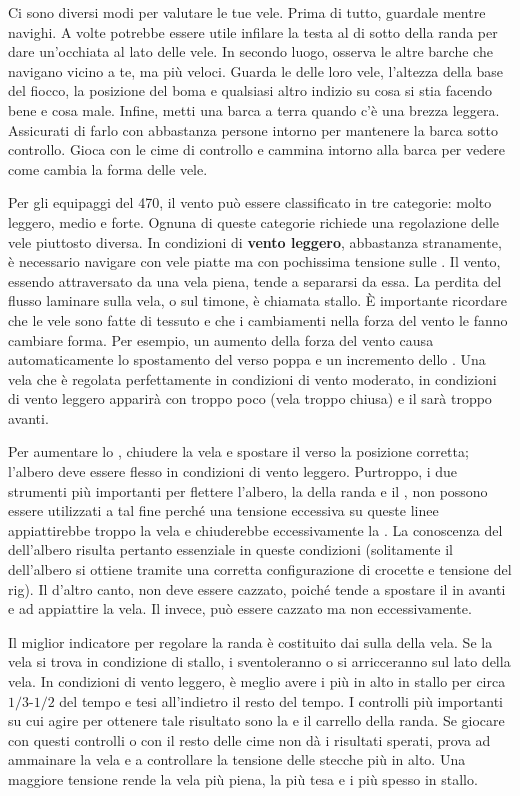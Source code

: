 Ci sono diversi modi per valutare le tue vele. Prima di tutto, guardale mentre
navighi. A volte potrebbe essere utile infilare la testa al di sotto della randa
per dare un'occhiata al lato \leeward delle vele. In secondo luogo, osserva le
altre barche che navigano vicino a te, ma più veloci. Guarda le \leeches delle
loro vele, l'altezza della base del fiocco, la posizione del boma e qualsiasi
altro indizio su cosa si stia facendo bene e cosa male. Infine, metti una barca
a terra quando c'è una brezza leggera. Assicurati di farlo con abbastanza
persone intorno per mantenere la barca sotto controllo. Gioca con le cime di
controllo e cammina intorno alla barca per vedere come cambia la forma delle
vele.

Per gli equipaggi del 470, il vento può essere classificato in tre categorie:
molto leggero, medio e forte. Ognuna di queste categorie richiede una
regolazione delle vele piuttosto diversa. In condizioni di \textbf{vento
leggero}, abbastanza stranamente, è necessario navigare con vele piatte ma con
pochissima tensione sulle \sheets. Il vento, essendo attraversato da una vela
piena, tende a separarsi da essa. La perdita del flusso laminare sulla vela, o
sul timone, è chiamata stallo. È importante ricordare che le vele sono fatte di
tessuto e che i cambiamenti nella forza del vento le fanno cambiare forma. Per
esempio, un aumento della forza del vento causa automaticamente lo spostamento
del \draft verso poppa e un incremento dello \twist. Una vela che è regolata
perfettamente in condizioni di vento moderato, in condizioni di vento leggero
apparirà con troppo poco \twist (vela troppo chiusa) e il \draft sarà troppo
avanti.

Per aumentare lo \twist, chiudere la vela e spostare il \draft verso la
posizione corretta; l'albero deve essere flesso in condizioni di vento leggero.
Purtroppo, i due strumenti più importanti per flettere l'albero, la \sheet della
randa e il \vang, non possono essere utilizzati a tal fine perché una tensione
eccessiva su queste linee appiattirebbe troppo la vela e chiuderebbe
eccessivamente la \leech. La conoscenza del \prebend dell'albero risulta
pertanto essenziale in queste condizioni (solitamente il \prebend dell'albero si
ottiene tramite una corretta configurazione di crocette e tensione del rig). Il
\cunningham d'altro canto, non deve essere cazzato, poiché tende a spostare il
\draft in avanti e ad appiattire la vela. Il \outhaul invece, può essere cazzato
ma non eccessivamente.

Il miglior indicatore per regolare la randa è costituito dai \telltales sulla
\leech della vela. Se la vela si trova in condizione di stallo, i \telltales
sventoleranno o si arricceranno sul lato \leeward della vela. In condizioni di
vento leggero, è meglio avere i \telltales più in alto in stallo per circa
$1/3$-$1/2$ del tempo e tesi all'indietro il resto del tempo. I controlli più
importanti su cui agire per ottenere tale risultato sono la \sheet e il carrello
della randa. Se giocare con questi controlli o con il resto delle cime non dà i
risultati sperati, prova ad ammainare la vela e a controllare la tensione delle
stecche più in alto. Una maggiore tensione rende la vela più piena, la \leech
più tesa e i \telltales più spesso in stallo.

